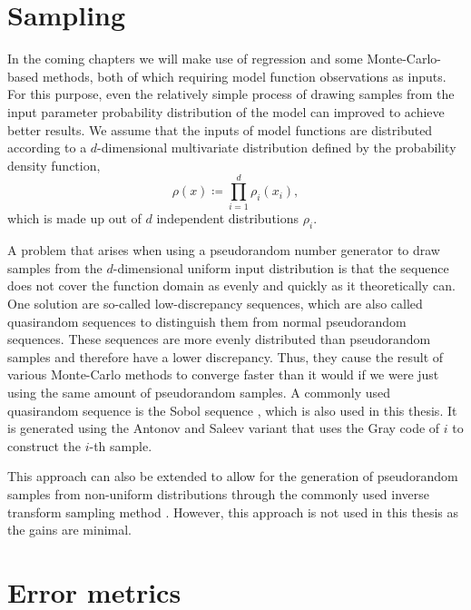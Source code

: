 \documentclass[
  a4paper,  %
  twoside,  %
  bibliography=totoc,
  headsepline,
  cleardoublepage=empty,
  parskip=half,
  draft=false
]{scrbook}
\begin{document}
\section{Sampling}
\label{sec:lds}

In the coming chapters we will make use of regression and some Monte-Carlo-based methods, both of which requiring model function observations as inputs.
For this purpose, even the relatively simple process of drawing samples from the input parameter probability distribution of the model can improved to achieve better results.
We assume that the inputs of model functions are distributed according to a $d$-dimensional multivariate distribution defined by the probability density function,
\begin{equation}
\rho(x) \coloneqq \prod_{i=1}^d \rho_i(x_i),
\end{equation}
which is made up out of $d$ independent distributions $\rho_i$.

A problem that arises when using a pseudorandom number generator to draw samples from the $d$-dimensional uniform input distribution is that the sequence does not cover the function domain as evenly and quickly as it theoretically can.
One solution are so-called low-discrepancy sequences, which are also called quasirandom sequences to distinguish them from normal pseudorandom sequences.
These sequences are more evenly distributed than pseudorandom samples and therefore have a lower discrepancy.
Thus, they cause the result of various Monte-Carlo methods to converge faster than it would if we were just using the same amount of pseudorandom samples.
A commonly used quasirandom sequence is the Sobol sequence \cite{Niederreiter1988}, which is also used in this thesis.
It is generated using the Antonov and Saleev variant that uses the Gray code of $i$ to construct the $i$-th sample.

This approach can also be extended to allow for the generation of pseudorandom samples from non-uniform distributions through the commonly used inverse transform sampling method \cite{Devroye1986}.
However, this approach is not used in this thesis as the gains are minimal.

\section{Error metrics}
\label{sec:errors}
\end{document}
